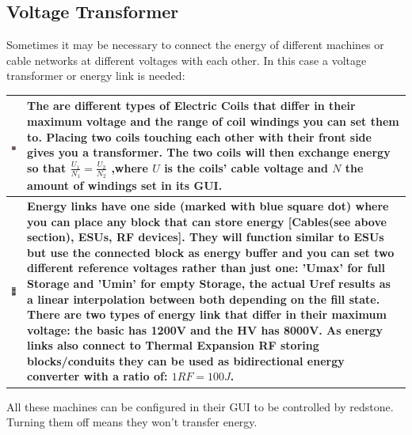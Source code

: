 \documentclass[11pt]{article} %
\makeatletter
\newcommand{\imgtex}{\begin{tabularx}{\textwidth}{@{}c@{ }X@{}}}
\makeatother
\begin{document}
\subsection{Voltage Transformer} \label{sec:transformer}
Sometimes it may be necessary to connect the energy of different machines or cable networks at different voltages with each other. In this case a voltage transformer or energy link is needed: \\
\imgtex \hline
\includegraphics[align = t]{blockTransformer} & The are different types of \bf Electric Coils \rm that differ in their maximum voltage and the range of coil windings you can set them to. Placing two coils touching each other with their front side gives you a transformer. The two coils will then exchange energy so that $\frac{U_1}{N_1}=\frac{U_2}{N_2}$ ,where $U$ is the coils' cable voltage and $N$ the amount of windings set in its GUI.\\ \hline
\includegraphics[align = t]{blockELink} & \bf Energy links \rm have one side (marked with blue square dot) where you can place any block that can store energy [Cables(see above section), ESUs, RF devices]. They will function similar to ESUs but use the connected block as energy buffer and you can set two different reference voltages rather than just one: 'Umax' for full Storage and 'Umin' for empty Storage, the actual Uref results as a linear interpolation between both depending on the fill state. There are two types of energy link that differ in their maximum voltage: the basic has 1200V and the HV has 8000V.  As energy links also connect to Thermal Expansion RF storing blocks/conduits they can be used as bidirectional energy converter with a ratio of: ${1RF = 100J}$. \\ \hline
\end{tabularx}
All these machines can be configured in their GUI to be controlled by redstone. Turning them off means they won't transfer energy.
\end{document}
